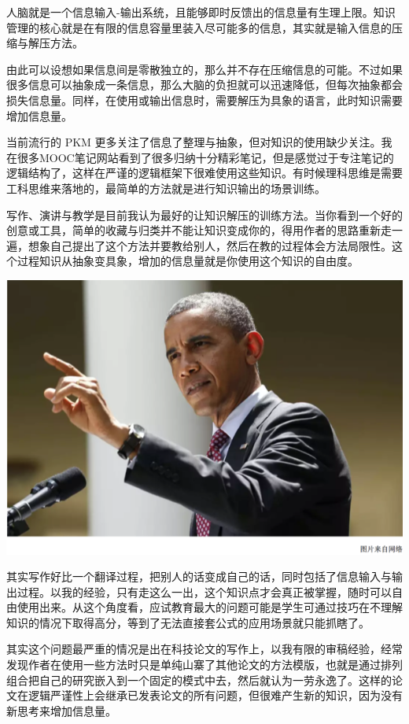 \documentclass[]{book}
\begin{document}
人脑就是一个信息输入-输出系统，且能够即时反馈出的信息量有生理上限。知识管理的核心就是在有限的信息容量里装入尽可能多的信息，其实就是输入信息的压缩与解压方法。

由此可以设想如果信息间是零散独立的，那么并不存在压缩信息的可能。不过如果很多信息可以抽象成一条信息，那么大脑的负担就可以迅速降低，但每次抽象都会损失信息量。同样，在使用或输出信息时，需要解压为具象的语言，此时知识需要增加信息量。

当前流行的 PKM
更多关注了信息了整理与抽象，但对知识的使用缺少关注。我在很多MOOC笔记网站看到了很多归纳十分精彩笔记，但是感觉过于专注笔记的逻辑结构了，这样在严谨的逻辑框架下很难使用这些知识。有时候理科思维是需要工科思维来落地的，最简单的方法就是进行知识输出的场景训练。

写作、演讲与教学是目前我认为最好的让知识解压的训练方法。当你看到一个好的创意或工具，简单的收藏与归类并不能让知识变成你的，得用作者的思路重新走一遍，想象自己提出了这个方法并要教给别人，然后在教的过程体会方法局限性。这个过程知识从抽象变具象，增加的信息量就是你使用这个知识的自由度。

\includegraphics[width=8.33in]{images/gtd3}

其实写作好比一个翻译过程，把别人的话变成自己的话，同时包括了信息输入与输出过程。以我的经验，只有走这么一出，这个知识点才会真正被掌握，随时可以自由使用出来。从这个角度看，应试教育最大的问题可能是学生可通过技巧在不理解知识的情况下取得高分，等到了无法直接套公式的应用场景就只能抓瞎了。

其实这个问题最严重的情况是出在科技论文的写作上，以我有限的审稿经验，经常发现作者在使用一些方法时只是单纯山寨了其他论文的方法模版，也就是通过排列组合把自己的研究嵌入到一个固定的模式中去，然后就认为一劳永逸了。这样的论文在逻辑严谨性上会继承已发表论文的所有问题，但很难产生新的知识，因为没有新思考来增加信息量。
\end{document}
